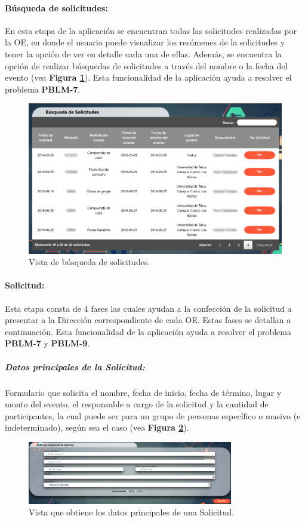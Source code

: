\paragraph{Búsqueda de solicitudes: } En esta etapa de la aplicación se encuentran todas las solicitudes realizadas por la OE, en donde el usuario puede visualizar los resúmenes de la solicitudes y tener la opción de ver en detalle cada una de ellas. Además, se encuentra la opción de realizar búsquedas de solicitudes a través del nombre o la fecha del evento (vea \textbf{Figura \ref{fig: Busquedas}}). Esta funcionalidad de la aplicación ayuda a resolver el problema \textbf{PBLM-7}.

\begin{figure}[h]
    \centering
    \includegraphics[width=0.69 \textwidth]{Imagenes/Busqueda.PNG}
    \caption{\label{fig: Busquedas}Vista de búsqueda de solicitudes.}
\end{figure}

\paragraph{Solicitud: }Esta etapa consta de 4 fases las cuales ayudan a la confección de la solicitud a presentar a la Dirección correspondiente de cada OE. Estas fases se detallan a continuación. Esta funcionalidad de la aplicación ayuda a resolver el problema \textbf{PBLM-7} y \textbf{PBLM-9}.

    \subparagraph{\emph{Datos principales de la Solicitud: }} Formulario que solicita el nombre, fecha de inicio, fecha de término, lugar y monto del evento, el responsable a cargo de la solicitud y la cantidad de participantes, la cual puede ser para un grupo de personas específico o masivo (e indeterminado), según sea el caso (vea \textbf{Figura \ref{fig: DatosPrincipales}}).

    \begin{figure}[h]
        \centering
        \includegraphics[width= 0.8\textwidth]{Imagenes/DatosPrincipales.PNG}
        \caption{\label{fig: DatosPrincipales}Vista que obtiene los datos principales de una Solicitud.}
    \end{figure}

